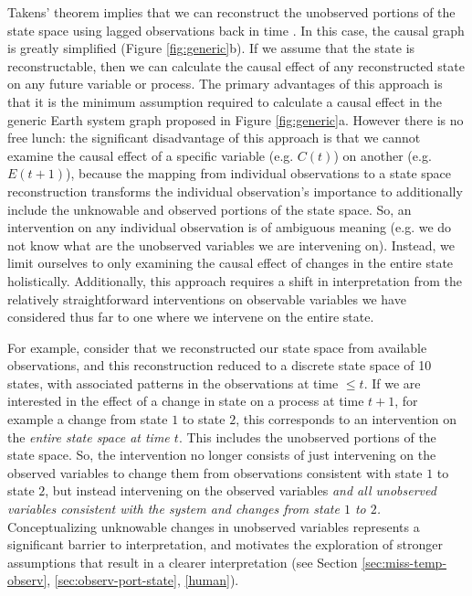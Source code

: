 \documentclass[12pt]{article}
\begin{document}
Takens' theorem implies that we can reconstruct the unobserved
portions of the state space using lagged observations back in time
\citep{takens1981detecting,deyle2011generalized,Sugihara496}. In this
case, the causal graph is greatly simplified (Figure
\ref{fig:generic}b). If we assume that the state is reconstructable,
then we can calculate the causal effect of any reconstructed state on
any future variable or process. The primary advantages of this
approach is that it is the minimum assumption required to calculate a
causal effect in the generic Earth system graph proposed in Figure
\ref{fig:generic}a. However there is no free lunch: the significant
disadvantage of this approach is that we cannot examine the causal
effect of a specific variable (e.g. $C(t)$) on another
(e.g. $E(t+1)$), because the mapping from individual observations to a
state space reconstruction transforms the individual observation's
importance to additionally include the unknowable and observed
portions of the state space. So, an intervention on any individual
observation is of ambiguous meaning (e.g. we do not know what are the
unobserved variables we are intervening on). Instead, we limit
ourselves to only examining the causal effect of changes in the entire
state holistically. Additionally, this approach requires a shift in
interpretation from the relatively straightforward interventions on
observable variables we have considered thus far to one where we
intervene on the entire state.

For example, consider that we reconstructed our state space from
available observations, and this reconstruction reduced to a discrete
state space of 10 states, with associated patterns in the observations
at time $\leq t$. If we are interested in the effect of a change in
state on a process at time $t+1$, for example a change from state $1$
to state $2$, this corresponds to an intervention on the
\textit{entire state space at time $t$}. This includes the unobserved
portions of the state space. So, the intervention no longer consists
of just intervening on the observed variables to change them from
observations consistent with state $1$ to state $2$, but instead
intervening on the observed variables \emph{and all unobserved
  variables consistent with the system and changes from state $1$ to
  $2$.}  Conceptualizing unknowable changes in unobserved variables
represents a significant barrier to interpretation, and motivates the
exploration of stronger assumptions that result in a clearer
interpretation (see Section \ref{sec:miss-temp-observ},
\ref{sec:observ-port-state}, \ref{human}).
\end{document}
